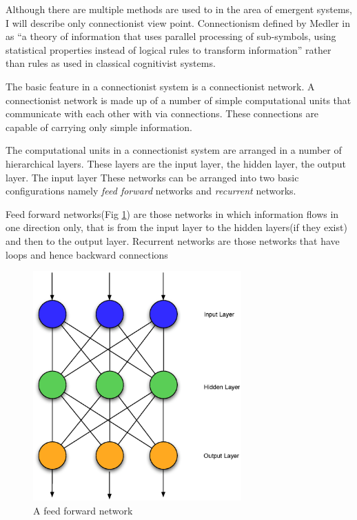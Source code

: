      Although there are multiple methods are used to in the area of
     emergent systems, I will describe only connectionist view
     point. Connectionism defined by Medler in \cite{Medler98abrief}
     as ``a theory of information that uses parallel processing of
     sub-symbols, using statistical properties instead of logical
     rules to transform information'' rather than rules as used in
     classical cognitivist systems.

     The basic feature in a connectionist system is a connectionist
     network. A connectionist network is made up of a number of simple
     computational units that communicate with each other with via
     connections. These connections are capable of carrying only
     simple information.
     
     The computational units in a connectionist system are arranged in
     a number of hierarchical layers. These layers are the input
     layer, the hidden layer, the output layer. The input layer These
     networks can be arranged into two basic configurations namely
     \emph{feed forward} networks and \emph{recurrent} networks.

     Feed forward networks(Fig \ref{ASCA_AFFN}) are those networks in
     which information flows in one direction only, that is from the
     input layer to the hidden layers(if they exist) and then to the
     output layer. Recurrent networks are those networks that have
     loops and hence backward connections

     \begin{figure}[htp]
     \centering
     \includegraphics[width=80mm]{FeedForwardNetwork.eps}
     \caption{A feed forward network}
     \label{ASCA_AFFN}
     \end{figure}
     
